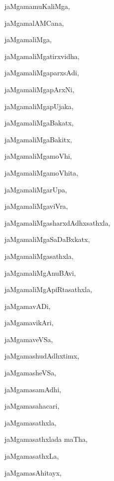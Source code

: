 \begin{multicols}{2}
{jaMgamamuKaliMga}, \pageref{jaMgamamuKaliMga}

{jaMgamalAMCana}, \pageref{jaMgamalAMCana}

{jaMgamaliMga}, \pageref{jaMgamaliMga}

{jaMgamaliMgatirxvidha}, \pageref{jaMgamaliMgatirxvidha}

{jaMgamaliMgaparxsAdi}, \pageref{jaMgamaliMgaparxsAdi}

{jaMgamaliMgapArxNi}, \pageref{jaMgamaliMgapArxNi}

{jaMgamaliMgapUjaka}, \pageref{jaMgamaliMgapUjaka}

{jaMgamaliMgaBakatx}, \pageref{jaMgamaliMgaBakatx}

{jaMgamaliMgaBakitx}, \pageref{jaMgamaliMgaBakitx}

{jaMgamaliMgamoVhi}, \pageref{jaMgamaliMgamoVhi}

{jaMgamaliMgamoVhita}, \pageref{jaMgamaliMgamoVhita}

{jaMgamaliMgarUpa}, \pageref{jaMgamaliMgarUpa}

{jaMgamaliMgaviVra}, \pageref{jaMgamaliMgaviVra}

{jaMgamaliMgasharxdAdhxsathxla}, \pageref{jaMgamaliMgasharxdAdhxsathxla}

{jaMgamaliMgaSaDaBxkatx}, \pageref{jaMgamaliMgaSaDaBxkatx}

{jaMgamaliMgasathxla}, \pageref{jaMgamaliMgasathxla}

{jaMgamaliMgAnuBAvi}, \pageref{jaMgamaliMgAnuBAvi}

{jaMgamaliMgApiRtasathxla}, \pageref{jaMgamaliMgApiRtasathxla}

{jaMgamavADi}, \pageref{jaMgamavADi}

{jaMgamavikAri}, \pageref{jaMgamavikAri}

{jaMgamaveVSa}, \pageref{jaMgamaveVSa}

{jaMgamashudAdhxtimx}, \pageref{jaMgamashudAdhxtimx}

{jaMgamasheVSa}, \pageref{jaMgamasheVSa}

{jaMgamasamAdhi}, \pageref{jaMgamasamAdhi}

{jaMgamasahacari}, \pageref{jaMgamasahacari}

{jaMgamasathxla}, \pageref{jaMgamasathxla}

{jaMgamasathxlada maTha}, \pageref{jaMgamasathxlada maTha}

{jaMgamasathxLa}, \pageref{jaMgamasathxLa}

{jaMgamasAhitayx}, \pageref{jaMgamasAhitayx}


\end{multicols}
